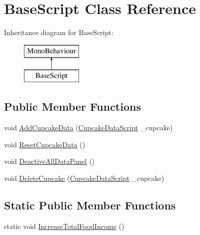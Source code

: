 \hypertarget{class_base_script}{}\section{Base\+Script Class Reference}
\label{class_base_script}
Inheritance diagram for Base\+Script\+:\begin{figure}[H]
\begin{center}
\leavevmode
\includegraphics[height=2.000000cm]{class_base_script}
\end{center}
\end{figure}
\subsection*{Public Member Functions}
\begin{DoxyCompactItemize}
\item 
void \mbox{\hyperlink{class_base_script_a626637a12b116f38e80d0e65c36986b5}{Add\+Cupcake\+Data}} (\mbox{\hyperlink{class_cupcake_data_script}{Cupcake\+Data\+Script}} \+\_\+cupcake)
\item 
void \mbox{\hyperlink{class_base_script_a7460c7d0fb79fcbcfc9d70441c1d4e8a}{Reset\+Cupcake\+Data}} ()
\item 
void \mbox{\hyperlink{class_base_script_a22828ab8a06241acaf8f805357ff6ba6}{Deactive\+All\+Data\+Panel}} ()
\item 
void \mbox{\hyperlink{class_base_script_a2cccfe7987370235977b1bad4020c423}{Delete\+Cupcake}} (\mbox{\hyperlink{class_cupcake_data_script}{Cupcake\+Data\+Script}} \+\_\+cupcake)
\end{DoxyCompactItemize}
\subsection*{Static Public Member Functions}
\begin{DoxyCompactItemize}
\item 
static void \mbox{\hyperlink{class_base_script_a527e535058b1b6b125e0e36e0e8c152f}{Increase\+Total\+Food\+Income}} ()
\end{DoxyCompactItemize}

